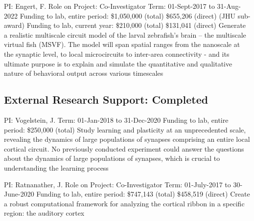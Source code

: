 \documentclass[10pt,colorlinks=true,urlcolor=blue]{moderncv}
\begin{document}
{\newline PI: Engert, F.
\newline Role on Project: Co-Investigator
\newline Term: 01-Sept-2017 to 31-Aug-2022
\newline Funding to lab, entire period: \$1,050,000 (total) \$655,206 (direct) (JHU sub-award)
\newline Funding to lab, current year: \$210,000 (total) \$131,041 (direct)
\newline Generate a realistic multiscale circuit model of the larval zebrafish’s brain – the multiscale
virtual fish (MSVF). The model will span spatial ranges from the nanoscale at the synaptic
level, to local microcircuits to inter-area connectivity - and its ultimate purpose is to explain
and simulate the quantitative and qualitative nature of behavioral output across various
timescales}{}{}{}


\subsection{External Research Support: Completed}

{\newline PI: Vogelstein, J.
\newline Term: 01-Jan-2018 to 31-Dec-2020
\newline Funding to lab, entire period: \$250,000 (total)
\newline Study learning and plasticity at an unprecedented scale, revealing the dynamics of large
populations of synapses comprising an entire local cortical circuit. No previously conducted
experiment could answer the questions about the dynamics of large populations of
synapses, which is crucial to understanding the learning process}{}{}{}

{\newline PI: Ratnanather, J.
\newline Role on Project: Co-Investigator
\newline Term: 01-July-2017 to 30-June-2020
\newline Funding to lab, entire period: \$747,143 (total) \$458,519 (direct)
\newline Create a robust computational framework for analyzing the cortical ribbon in a specific
region: the auditory cortex}{}{}{}
\end{document}
